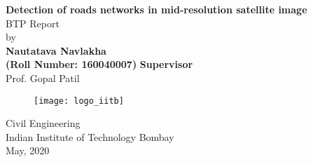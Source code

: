 \begin{titlepage}
  \vspace{3 cm}
  \begin{center}
  \large{\textbf{Detection of roads networks in mid-resolution satellite image}}\bigskip \\
  
  \vspace{3mm}
  \vfill
  BTP  Report \\
  by \bigskip \\
  \textbf{Nautatava Navlakha\\(Roll Number: 160040007)}
  \vfill
  \textbf{Supervisor}\\
  Prof. Gopal Patil\\
\vfill  \begin{figure}[h]
  \texttt{[image: logo\_iitb]}
  \centering
  \end{figure}
  \vfill
  \large
  
Civil Engineering\\
Indian Institute of Technology Bombay\\
May, 2020
\end{center}
\vfill %
\end{titlepage}
